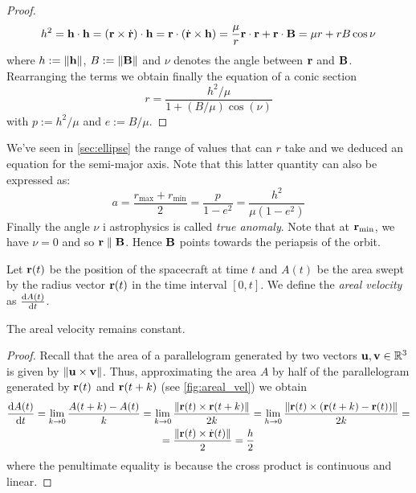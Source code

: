 \documentclass[../main.tex]{subfiles}
\begin{document}
\begin{proof}
  \begin{equation}
    h^2=\boldsymbol{\mathrm{h}}\cdot\boldsymbol{\mathrm{h}}=(\boldsymbol{\mathrm{r}}\times\dot{\boldsymbol{\mathrm{r}}})\cdot\boldsymbol{\mathrm{h}}=\boldsymbol{\mathrm{r}}\cdot(\dot{\boldsymbol{\mathrm{r}}}\times\boldsymbol{\mathrm{h}})=\frac{\mu}{r}\boldsymbol{\mathrm{r}}\cdot\boldsymbol{\mathrm{r}}+\boldsymbol{\mathrm{r}}\cdot\boldsymbol{\mathrm{B}}=\mu r+rB\cos\nu
  \end{equation}
  where $h:=\left\|\boldsymbol{\mathrm{h}}\right\|$, $B:=\left\|\boldsymbol{\mathrm{B}}\right\|$ and $\nu$ denotes the angle between $\boldsymbol{\mathrm{r}}$ and $\boldsymbol{\mathrm{B}}$. Rearranging the terms we obtain finally the equation of a conic section
  \begin{equation}\label{eq:r_conic}
    r=\frac{h^2/\mu}{1+(B/\mu)\cos(\nu)}
  \end{equation}
  with $p:=h^2/\mu$ and $e:=B/\mu$.
\end{proof}
We've seen in \cref{sec:ellipse} the range of values that can $r$ take and we deduced an equation for the semi-major axis. Note that this latter quantity can also be expressed as:
\begin{equation}\label{eq:semi-major_axis}
  a=\frac{r_\mathrm{max}+r_\mathrm{min}}{2}=\frac{p}{1-e^2}=\frac{h^2}{\mu(1-e^2)}
\end{equation}
Finally the angle $\nu$ i  astrophysics is called \emph{true anomaly}. Note that at $\boldsymbol{\mathrm{r}}_\mathrm{min}$, we have $\nu=0$ and so $\boldsymbol{\mathrm{r}}\parallel\boldsymbol{\mathrm{B}}$. Hence $\boldsymbol{\mathrm{B}}$ points towards the periapsis of the orbit.
\begin{definition}
  Let $\boldsymbol{\mathrm{r}}(t)$ be the position of the spacecraft at time $t$ and $A(t)$ be the area swept by the radius vector $\boldsymbol{\mathrm{r}}(t)$ in the time interval $[0,t]$. We define the \emph{areal velocity} as $\dv{A(t)}{t}$.
\end{definition}
\begin{proposition}
  The areal velocity remains constant.
\end{proposition}
\begin{proof}
  Recall that the area of a parallelogram generated by two vectors $\boldsymbol{\mathrm{u}},\boldsymbol{\mathrm{v}}\in\mathbb{R}^3$ is given by $\left\|\boldsymbol{\mathrm{u}}\times\boldsymbol{\mathrm{v}}\right\|$. Thus, approximating the area $A$ by half of the parallelogram generated by $\boldsymbol{\mathrm{r}}(t)$ and ${\boldsymbol{\mathrm{r}}}(t+k)$ (see \cref{fig:areal_vel}) we obtain
  \begin{multline}\label{eq:areal_velocity}
    \dv{A(t)}{t}=\lim_{k\to 0}\frac{A(t+k)-A(t)}{k}=\lim_{k\to 0}\frac{\left\|\boldsymbol{\mathrm{r}}(t)\times\boldsymbol{\mathrm{r}}(t+k)\right\|}{2k}=\lim_{h\to 0}\frac{\left\|\boldsymbol{\mathrm{r}}(t)\times(\boldsymbol{\mathrm{r}}(t+k)-\boldsymbol{\mathrm{r}}(t))\right\|}{2k}=\\
    =\frac{\left\|\boldsymbol{\mathrm{r}}(t)\times\dot{\boldsymbol{\mathrm{r}}}(t)\right\|}{2}=\frac{h}{2}
  \end{multline}
  where the penultimate equality is because the cross product is continuous and linear.
\end{proof}
\end{document}
